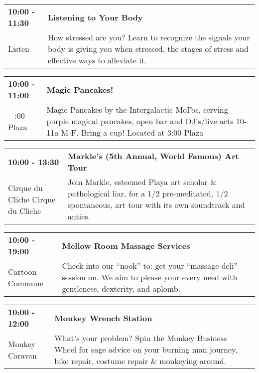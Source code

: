 \begin{tabular}{ p{1in} p{2.2in} }
    \textbf{10:00 - 11:30} & \textbf{Listening to Your Body} \\
    Listen \newline  & How stressed are you? Learn to recognize the signals your body is giving you when stressed, the stages of stress and effective ways to alleviate it. \\
    \hline 
\end{tabular}
    
\begin{tabular}{ p{1in} p{2.2in} }
    \textbf{10:00 - 11:00} & \textbf{Magic Pancakes!} \\
    ~ \newline 3:00 Plaza & Magic Pancakes by the Intergalactic MoFos, serving purple magical pancakes, open bar and DJ's/live acts 10-11a M-F. Bring a cup! Located at 3:00 Plaza \\
    \hline 
\end{tabular}
    
\begin{tabular}{ p{1in} p{2.2in} }
    \textbf{10:00 - 13:30} & \textbf{Markle's (5th Annual, World Famous) Art Tour} \\
    Cirque du Cliche \newline Cirque du Cliche & Join Markle, esteemed Playa art scholar \& pathological liar, for a 1/2  pre-meditated, 1/2 spontaneous, art tour with its own soundtrack and antics. \\
    \hline 
\end{tabular}
    
\begin{tabular}{ p{1in} p{2.2in} }
    \textbf{10:00 - 19:00} & \textbf{Mellow Room Massage Services} \\
    Cartoon Commune \newline  & Check into our ``nook'' to: get your ``massage deli'' session on. We aim to please your every need with gentleness, dexterity, and aplomb. \\
    \hline 
\end{tabular}
    
\begin{tabular}{ p{1in} p{2.2in} }
    \textbf{10:00 - 12:00} & \textbf{Monkey Wrench Station} \\
    Monkey Caravan \newline  & What's your problem? Spin the Monkey Business Wheel for sage advice on your burning man journey, bike repair, costume repair \& monkeying around. \\
    \hline 
\end{tabular}
    
